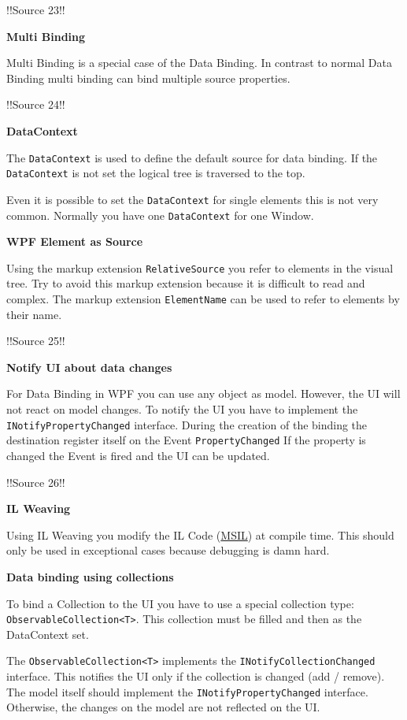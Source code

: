 \documentclass[10pt,twoside,landscape]{article}
\begin{document}
\begin{multicols}{4}
!!Source 23!!

\textbf{Multi Binding}

Multi Binding is a special case of the Data Binding.
In contrast to normal Data Binding multi binding can bind multiple source properties.

!!Source 24!!

\textbf{DataContext}

The \texttt{DataContext} is used to define the default source for data binding.
If the \texttt{DataContext} is not set the logical tree is traversed to the top.

Even it is possible to set the \texttt{DataContext} for single elements this is not very common.
Normally you have one \texttt{DataContext} for one Window.


\textbf{WPF Element as Source}

Using the markup extension \texttt{RelativeSource} you refer to elements in the visual tree.
Try to avoid this markup extension because it is difficult to read and complex.
The markup extension \texttt{ElementName} can be used to refer to elements by their name.

!!Source 25!!

\textbf{Notify UI about data changes}

For Data Binding in WPF you can use any object as model.
However, the UI will not react on model changes.
To notify the UI you have to implement the \texttt{INotifyPropertyChanged} interface.
During the creation of the binding the destination register itself on the Event \texttt{PropertyChanged}
If the property is changed the Event is fired and the UI can be updated.

!!Source 26!!

\textbf{IL Weaving}

Using IL Weaving you modify the IL Code (\href{../../../roam/20211003114528-microsoft_intermediate_language.org}{MSIL}) at compile time.
This should only be used in exceptional cases because debugging is damn hard.

\textbf{Data binding using collections}

To bind a Collection to the UI you have to use a special collection type: \texttt{ObservableCollection<T>}.
This collection must be filled and then as the DataContext set.

The \texttt{ObservableCollection<T>} implements the \texttt{INotifyCollectionChanged} interface.
This notifies the UI only if the collection is changed (add / remove).
The model itself should implement the \texttt{INotifyPropertyChanged} interface.
Otherwise, the changes on the model are not reflected on the UI.


\end{multicols}
\end{document}
